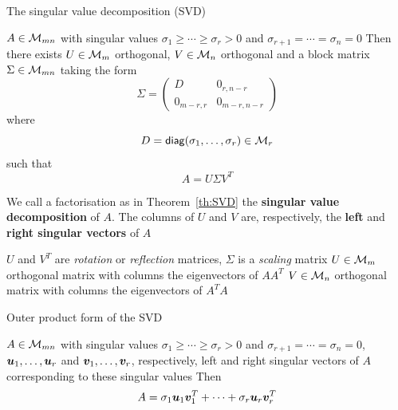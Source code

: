 \documentclass[aspectratio=169]{beamer}\usepackage[]{graphicx}\usepackage[]{xcolor}
\begin{document}

\begin{frame}{The singular value decomposition (SVD)}
\begin{importanttheorem}[SVD]\label{th:SVD}
$A\in\mathcal{M}_{mn}$ with singular values $\sigma_1\geq\cdots\geq\sigma_r>0$ and $\sigma_{r+1}=\cdots=\sigma_n=0$
\vskip0.5cm
Then there exists $U\in\mathcal{M}_m$ orthogonal, $V\in\mathcal{M}_n$ orthogonal and a block matrix $\Sigma\in\mathcal{M}_{mn}$ taking the form
\[
\Sigma=
\begin{pmatrix}
D & 0_{r,n-r} \\
0_{m-r,r} & 0_{m-r,n-r}
\end{pmatrix}
\]
where 
\[
D = \mathsf{diag}(\sigma_1,\ldots,\sigma_r)\in\mathcal{M}_r
\] 
such that
\[
A=U\Sigma V^T
\]
\end{importanttheorem}
\end{frame}


\begin{frame}
\begin{definition}
We call a factorisation as in Theorem~\ref{th:SVD} the \textbf{singular value decomposition} of $A$. The columns of $U$ and $V$ are, respectively, the \textbf{left} and \textbf{right singular vectors} of $A$
\end{definition}
\vfill
$U$ and $V^T$ are \emph{rotation} or \emph{reflection} matrices, $\Sigma$ is a \emph{scaling} matrix
\vfill
$U\in\mathcal{M}_m$ orthogonal matrix with columns the eigenvectors of $AA^T$
\vfill
$V\in\mathcal{M}_n$ orthogonal matrix with columns the eigenvectors of $A^TA$
\end{frame}


\begin{frame}{Outer product form of the SVD}
\begin{theorem}\label{th:SVD_outer_product_form}
$A\in\mathcal{M}_{mn}$ with singular values $\sigma_1\geq\cdots\geq\sigma_r>0$ and $\sigma_{r+1}=\cdots=\sigma_n=0$, $\bm{u}_1,\ldots,\bm{u}_r$ and $\bm{v}_1,\ldots,\bm{v}_r$, respectively, left and right singular vectors of $A$ corresponding to these singular values
\vskip0.5cm
Then 
\begin{equation}\label{eq:outer-product-form-SVD}
A=\sigma_1\bm{u}_1\bm{v}_1^T+\cdots+\sigma_r\bm{u}_r\bm{v}_r^T
\end{equation}
\end{theorem}
\end{frame}

\end{document}
